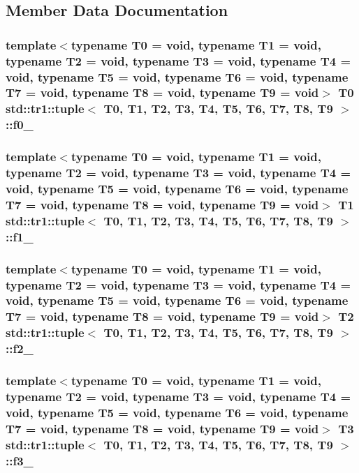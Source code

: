 \subsection{Member Data Documentation}
\hypertarget{classstd_1_1tr1_1_1tuple_a133b02f631ce9c46c8368756d5ce7d68}{
\subsubsection[{f0\-\_\-}]{\setlength{\rightskip}{0pt plus 5cm}template$<$typename T0 = void, typename T1 = void, typename T2 = void, typename T3 = void, typename T4 = void, typename T5 = void, typename T6 = void, typename T7 = void, typename T8 = void, typename T9 = void$>$ T0 {\bf std\-::tr1\-::tuple}$<$ T0, T1, T2, T3, T4, T5, T6, T7, T8, T9 $>$\-::f0\-\_\-}}\label{classstd_1_1tr1_1_1tuple_a133b02f631ce9c46c8368756d5ce7d68}
\hypertarget{classstd_1_1tr1_1_1tuple_a809d974a332969e624830b02d9361107}{
\subsubsection[{f1\-\_\-}]{\setlength{\rightskip}{0pt plus 5cm}template$<$typename T0 = void, typename T1 = void, typename T2 = void, typename T3 = void, typename T4 = void, typename T5 = void, typename T6 = void, typename T7 = void, typename T8 = void, typename T9 = void$>$ T1 {\bf std\-::tr1\-::tuple}$<$ T0, T1, T2, T3, T4, T5, T6, T7, T8, T9 $>$\-::f1\-\_\-}}\label{classstd_1_1tr1_1_1tuple_a809d974a332969e624830b02d9361107}
\hypertarget{classstd_1_1tr1_1_1tuple_a1a3d444570fccf3810322a5cea025993}{
\subsubsection[{f2\-\_\-}]{\setlength{\rightskip}{0pt plus 5cm}template$<$typename T0 = void, typename T1 = void, typename T2 = void, typename T3 = void, typename T4 = void, typename T5 = void, typename T6 = void, typename T7 = void, typename T8 = void, typename T9 = void$>$ T2 {\bf std\-::tr1\-::tuple}$<$ T0, T1, T2, T3, T4, T5, T6, T7, T8, T9 $>$\-::f2\-\_\-}}\label{classstd_1_1tr1_1_1tuple_a1a3d444570fccf3810322a5cea025993}
\hypertarget{classstd_1_1tr1_1_1tuple_a7d1ea537cc17e4c1aa1e4a7b39822c93}{
\subsubsection[{f3\-\_\-}]{\setlength{\rightskip}{0pt plus 5cm}template$<$typename T0 = void, typename T1 = void, typename T2 = void, typename T3 = void, typename T4 = void, typename T5 = void, typename T6 = void, typename T7 = void, typename T8 = void, typename T9 = void$>$ T3 {\bf std\-::tr1\-::tuple}$<$ T0, T1, T2, T3, T4, T5, T6, T7, T8, T9 $>$\-::f3\-\_\-}}\label{classstd_1_1tr1_1_1tuple_a7d1ea537cc17e4c1aa1e4a7b39822c93}
